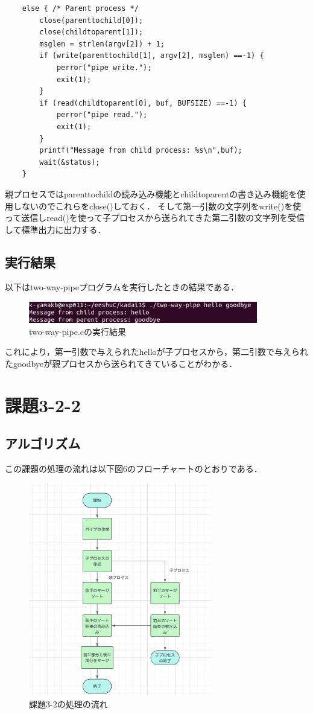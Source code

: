 \documentclass[dvipdfmx]{jarticle}
\begin{document}
\begin{enumerate}
\begin{lstlisting}
    else { /* Parent process */
        close(parenttochild[0]);
        close(childtoparent[1]);
        msglen = strlen(argv[2]) + 1;
        if (write(parenttochild[1], argv[2], msglen) ==-1) {
            perror("pipe write.");
            exit(1);
        }
        if (read(childtoparent[0], buf, BUFSIZE) ==-1) {
            perror("pipe read.");
            exit(1);
        }
        printf("Message from child process: %s\n",buf);
        wait(&status);
    }
    \end{lstlisting}
    親プロセスではparenttochildの読み込み機能とchildtoparentの書き込み機能を使用しないのでこれらをclose()しておく．
    そして第一引数の文字列をwrite()を使って送信しread()を使って子プロセスから送られてきた第二引数の文字列を受信して標準出力に出力する．
\end{enumerate}
\subsection{実行結果}
以下はtwo-way-pipeプログラムを実行したときの結果である．
\begin{figure}[h]
    \centering
    \includegraphics[width=10cm]{result3-2-1.png}
    \caption{two-way-pipe.cの実行結果}
\end{figure}
これにより，第一引数で与えられたhelloが子プロセスから，第二引数で与えられたgoodbyeが親プロセスから送られてきていることがわかる．
\section{課題3-2-2}
\subsection{アルゴリズム}
この課題の処理の流れは以下図6のフローチャートのとおりである．\clearpage
\begin{figure}[h]
    \centering
    \includegraphics[width=8cm]{3-2-2hurotya.png}
    \caption{課題3-2の処理の流れ}
\end{figure}
\end{document}

